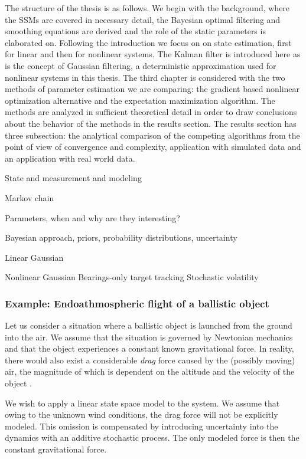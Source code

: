 The structure of the thesis is as follows. We begin with the background, where
the SSMs are covered in necessary detail, the Bayesian optimal filtering
and smoothing equations are derived and the role of the static parameters is elaborated
on. Following the introduction we focus on on state estimation, first for linear
and then for nonlinear systems. The Kalman filter is introduced here as is the
concept of Gaussian filtering, a deterministic approximation used for nonlinear systems 
in this thesis. The third chapter is considered with the two methods
of parameter estimation we are comparing: the gradient based nonlinear optimization alternative
and the expectation maximization algorithm. The methods are analyzed in sufficient
theoretical detail in order to draw conclusions about the behavior of the methods
in the results section. The results section has three subsection: the analytical 
comparison of the competing algorithms from the point of view of convergence
and complexity, application with simulated data and an application with real world data.

State and measurement and modeling

Markov chain

Parameters, when and why are they interesting?

Bayesian approach, priors, probability distributions, uncertainty

Linear Gaussian 
  


Nonlinear Gaussian
  Bearings-only target tracking
  Stochastic volatility



 

\subsubsection*{Example: Endoathmospheric flight of a ballistic object}
Let us consider a situation where a ballistic object is launched
from the ground into the air. We assume that the situation is governed by Newtonian
mechanics and that the object experiences a constant known gravitational
force. In reality, there would also exist a considerable \emph{drag} force
caused by the (possibly moving) air, the magnitude of which is dependent
on the altitude and the velocity of the object \parencite{ristic2004beyond}. 

We wish to apply a linear state space model to the system. We assume
that owing to the unknown wind conditions, the drag force will not be
explicitly modeled. This omission is compensated by introducing
uncertainty into the dynamics with an additive stochastic process.
The only modeled force is then the constant gravitational force.

